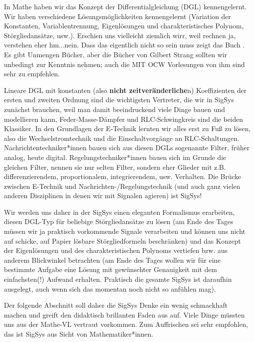 In Mathe haben wir das Konzept der Differentialgleichung (DGL) kennengelernt.
%
Wir haben verschiedene Lösungsmöglichkeiten kennengelernt (Variation
der Konstanten, Variablentrennung, Eigenlösungen und charakteristisches Polynom,
Störgliedansätze, usw.). Erschien uns vielleicht ziemlich wirr, weil rechnen
ja, verstehen eher hm...nein. Dass das eigentlich nicht so sein muss zeigt
das Buch \cite{Strang2014}. Es gibt Unmengen Bücher,
aber die Bücher von Gilbert Strang sollten wir unbedingt zur Kenntnis nehmen;
auch die MIT OCW Vorlesungen von ihm sind sehr zu empfehlen.


Lineare DGL mit konstanten (also \textbf{nicht zeitveränderliche}n) Koeffizienten der
ersten und zweiten Ordnung sind die wichtigsten Vertreter, die wir in SigSys
zunächst brauchen, weil man damit beeindruckend viele Dinge bauen und modellieren
kann, Feder-Masse-Dämpfer und RLC-Schwingkreis sind die beiden Klassiker.
%
In den Grundlagen der E-Technik lernten wir alles erst zu Fuß zu lösen, also
die Wechselstromtechnik und die Einschaltvorgänge an RLC-Schaltungen.
%
Nachrichtentechniker*innen bauen sich aus diesen DGLs sogenannte Filter,
früher analog, heute digital.
%
Regelungstechniker*innen bauen sich im Grunde die gleichen Filter, nennen sie nur
selten Filter, sondern eher Glieder mit z.B. differenzierendem, proportionalem,
integrierendem, usw. Verhalten.
%
Die Brücke zwischen E-Technik und Nachrichten-/Regelungstechnik (und auch
ganz vielen anderen Disziplinen in denen wir mit Signalen agieren) ist SigSys!

Wir werden uns daher in der SigSys einen eleganten Formalismus erarbeiten,
diesen DGL-Typ für beliebige Störgliedansätze zu lösen (am Ende des Tages
müssen wir ja praktisch vorkommende Signale verarbeiten und können uns nicht
auf schicke, auf Papier lösbare Störgliedformeln beschränken)
und das Konzept der Eigenlösungen und des charakteristischen
Polynoms vertiefen bzw. aus anderem Blickwinkel betrachten (am Ende des Tages
wollen wir für eine bestimmte Aufgabe eine Lösung mit gewünschter Genauigkeit
mit dem einfachsten(!) Aufwand erhalten. Praktisch die gesamte SigSys ist daraufhin
ausgelegt, auch wenn sich das momentan noch nicht so anfühlen mag).

Der folgende Abschnitt soll daher die SigSys Denke ein wenig schmackhaft machen und
greift den didaktisch brillanten Faden aus \cite{Strang2014} auf. Viele Dinge
müssten uns aus der Mathe-VL vertraut vorkommen.
%
Zum Auffrischen sei \cite{Burg2013} sehr empfohlen, das ist SigSys aus Sicht von
Mathematiker*innen.
%

